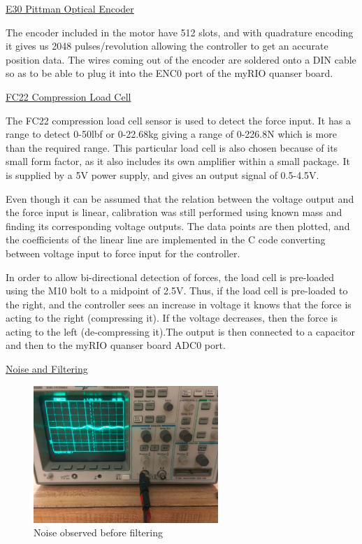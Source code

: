 \vspace{.167in}
\noindent\underline{E30 Pittman Optical Encoder}\par
\vspace{.08in}
The encoder included in the motor have 512 slots, and with quadrature encoding it gives us 2048 pulses/revolution allowing the controller to get an accurate position data. The wires coming out of the encoder are soldered onto a DIN cable so as to be able to plug it into the ENC0 port of the myRIO quanser board.\par 
\vspace{.167in}
\noindent\underline{FC22 Compression Load Cell}\par
\vspace{.08in}
The FC22 compression load cell sensor is used to detect the force input. It has a range to detect 0-50lbf or 0-22.68kg giving a range of 0-226.8N which is more than the required range. This particular load cell is also chosen because of its small form factor, as it also includes its own amplifier within a small package. It is supplied by a 5V power supply, and gives an output signal of 0.5-4.5V. \par
Even though it can be assumed that the relation between the voltage output and the force input is linear, calibration was still performed using known mass and finding its corresponding voltage outputs. The data points are then plotted, and the coefficients of the linear line are implemented in the C code converting between voltage input to force input for the controller. \par
In order to allow bi-directional detection of forces, the load cell is pre-loaded using the M10 bolt to a midpoint of 2.5V. Thus, if the load cell is pre-loaded to the right, and the controller sees an increase in voltage it knows that the force is acting to the right (compressing it). If the voltage decreases, then the force is acting to the left (de-compressing it).The output is then connected to a capacitor and then to the myRIO quanser board ADC0 port. \par
\vspace{.167in}
\noindent\underline{Noise and Filtering}\par
\vspace{.08in}
\begin{figure}[htbp]
\begin{center}
\includegraphics[width=2.75in]{Images/Before_Filter.PNG}
\caption{Noise observed before filtering}
\label{B_Filter}
\end{center}
\end{figure}
